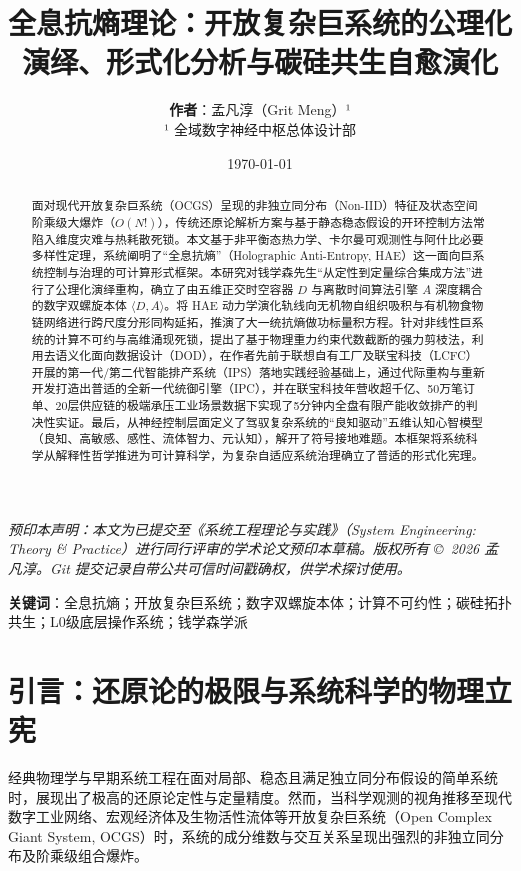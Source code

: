 \documentclass[11pt,a4paper]{article}
\title{\textbf{全息抗熵理论：开放复杂巨系统的公理化演绎、形式化分析与碳硅共生自愈演化}}
\author{\textbf{作者}：孟凡淳（Grit Meng）¹ \\ \small ¹ 全域数字神经中枢总体设计部}
\date{\today}
\begin{document}
\maketitle

\begin{center}
\small\itshape
预印本声明：本文为已提交至《系统工程理论与实践》（System Engineering: Theory \& Practice）进行同行评审的学术论文预印本草稿。版权所有 \copyright\ 2026 孟凡淳。Git 提交记录自带公共可信时间戳确权，供学术探讨使用。
\end{center}
\vspace{1em}

\begin{abstract}
面对现代开放复杂巨系统（OCGS）呈现的非独立同分布（Non-IID）特征及状态空间阶乘级大爆炸（$O(N!)$），传统还原论解析方案与基于静态稳态假设的开环控制方法常陷入维度灾难与热耗散死锁。本文基于非平衡态热力学、卡尔曼可观测性与阿什比必要多样性定理，系统阐明了“全息抗熵”（Holographic Anti-Entropy, HAE）这一面向巨系统控制与治理的可计算形式框架。本研究对钱学森先生“从定性到定量综合集成方法”进行了公理化演绎重构，确立了由五维正交时空容器 $D$ 与离散时间算法引擎 $A$ 深度耦合的数字双螺旋本体 $\langle D, A \rangle$。将 HAE 动力学演化轨线向无机物自组织吸积与有机物食物链网络进行跨尺度分形同构延拓，推演了大一统抗熵做功标量积方程。针对非线性巨系统的计算不可约与高维涌现死锁，提出了基于物理重力约束代数截断的强力剪枝法，利用去语义化面向数据设计（DOD），在作者先前于联想自有工厂及联宝科技（LCFC）开展的第一代/第二代智能排产系统（IPS）落地实践经验基础上，通过代际重构与重新开发打造出普适的全新一代统御引擎（IPC），并在联宝科技年营收超千亿、50万笔订单、20层供应链的极端承压工业场景数据下实现了5分钟内全盘有限产能收敛排产的判决性实证。最后，从神经控制层面定义了驾驭复杂系统的“良知驱动”五维认知心智模型（良知、高敏感、感性、流体智力、元认知），解开了符号接地难题。本框架将系统科学从解释性哲学推进为可计算科学，为复杂自适应系统治理确立了普适的形式化宪理。
\end{abstract}

\textbf{关键词}：全息抗熵；开放复杂巨系统；数字双螺旋本体；计算不可约性；碳硅拓扑共生；L0级底层操作系统；钱学森学派

\newpage

\section{引言：还原论的极限与系统科学的物理立宪}

经典物理学与早期系统工程在面对局部、稳态且满足独立同分布假设的简单系统时，展现出了极高的还原论定性与定量精度。然而，当科学观测的视角推移至现代数字工业网络、宏观经济体及生物活性流体等开放复杂巨系统（Open Complex Giant System, OCGS）时，系统的成分维数与交互关系呈现出强烈的非独立同分布及阶乘级组合爆炸。
\end{document}

